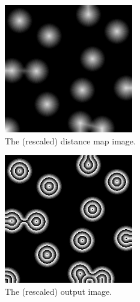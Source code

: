 \documentclass[IJ]{cesj}
\begin{document}
\begin{figure}
\centering
\includegraphics[width=0.5\textwidth]{distance}
\caption{The (rescaled) distance map image.}
\end{figure}

\begin{figure}
\centering
\includegraphics[width=0.5\textwidth]{modulus}
\caption{The (rescaled) output image.}
\end{figure}
\end{document}
